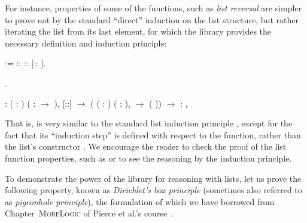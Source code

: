 For instance, properties of some of the functions, such as \textit{list
reversal} are simpler to prove not by the standard ``direct'' induction
on the list structure, but rather iterating the list from its last
element, for which the  library provides the necessary definition
and induction principle:


\coqdoceol
\coqdocemptyline
\coqdocnoindent
{}    :=     ::    ::     [:: ].

\coqdocemptyline


\begin{coqdoccode}
\coqdocemptyline
\coqdocnoindent
{} .\coqdoceol
\coqdocemptyline
\end{coqdoccode}


\coqdoceol
\coqdocemptyline
\coqdocnoindent
{}\coqdoceol
\coqdocindent{2.50em}
: \coqdockw{\ensuremath{\forall}} ( : ) ( :   \ensuremath{\rightarrow} ),\coqdoceol
\coqdocindent{3.50em}
 [::] \ensuremath{\rightarrow}\coqdoceol
\coqdocindent{3.50em}
(\coqdockw{\ensuremath{\forall}} ( :  ) ( : ),   \ensuremath{\rightarrow}  (  )) \ensuremath{\rightarrow}\coqdoceol
\coqdocindent{3.50em}
\coqdockw{\ensuremath{\forall}}  :  ,  

\coqdocemptyline


That is,  is very similar to the standard list induction
principle , except for the fact that its ``induction step'' is
defined with respect to the  function, rather than the list's
constructor . We encourage the reader to check the proof of the
list function properties, such as  or  to see the
reasoning by the  induction principle.




To demonstrate the power of the library for reasoning with lists, let
us prove the following property, known as \textit{Dirichlet's box principle}
(sometimes also referred to as \textit{pigeonhole principle}), the
formulation of which we have borrowed from
Chapter~\textsc{MoreLogic} of Pierce et al.'s
course~\cite{Pierce-al:SF}.


